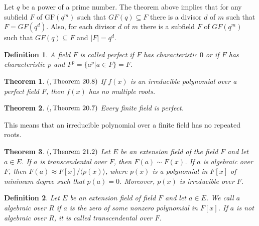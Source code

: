 \documentclass[11pt]{amsart}
\newcommand{\GF}{\mathrm{GF}}
\newtheorem{definition}{{\bf Definition}}
\newtheorem{theorem}{{\bf Theorem }}
\begin{document}
Let $q$ be a power of a prime number. The theorem above implies that for any subfield $F$ of $\GF(q^m)$ such that $GF(q) \subseteq F$ there is a divisor $d$ of $m$ such that $F = GF(q^d)$. Also, for each divisor $d$ of $m$ there is a subfield $F$ of $GF(q^m)$ such that $GF(q) \subseteq F$ and $\vert F\vert=q^d$.



\begin{definition}
A field $F$ is called \emph{perfect} if $F$ has characteristic $0$ or if $F$ has characteristic $p$ and $F^p = \lbrace a^p | a\in F\rbrace = F$.
\end{definition}

\begin{theorem}\label{FM2}$($\cite{G}$, \textnormal{Theorem } 20.8)$
If $f(x)$ is an irreducible polynomial over a perfect field $F$, then $f(x)$ has no multiple roots.
\end{theorem}

\begin{theorem} $($\cite{G}$, \textnormal{Theorem } 20.7)$
Every finite field is perfect.
\end{theorem}

This means that an irreducible polynomial over a finite field has no repeated roots.

\begin{theorem}$($\cite{G}$, \textnormal{Theorem }21.2)$
Let $E$ be an extension field of the field $F$ and let $a\in E$. If $a$ is transcendental over $F$, then $F(a)\sim F(x)$. If $a$ is algebraic over $F$, then $F(a)\approx F[x]/\langle p(x)\rangle$, where $p(x)$ is a polynomial in $F[x]$ of minimum degree such that $p(a)=0$. Moreover, $p(x)$ is irreducible over $F$.
\end{theorem}


\begin{definition}
Let $E$ be an extension field of field $F$ and let $a \in E$. We call $a$ \emph {algebraic over} $R$ if $a$ is the zero of some nonzero polynomial in $F[x]$. If $a$ is not algebraic over $R$, it is called transcendental over $F$.
\end{definition}
\end{document}
